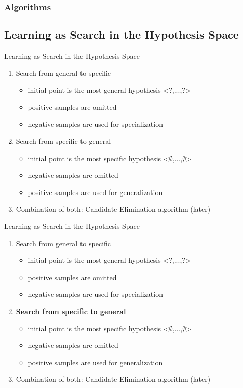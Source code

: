 \documentclass{beamer}
\begin{document}
\subsubsection{Algorithms}

\subsection{Learning as Search in the Hypothesis Space}
\begin{frame}{Learning as Search in the Hypothesis Space}
\begin{enumerate}
\item Search from general to specific
	\begin{itemize}
	\item initial point is the most general hypothesis <?,...,?>
    \item positive samples are omitted
    \item negative samples are used for specialization
	\end{itemize}
\item Search from specific to general
	\begin{itemize}
	\item initial point is the most specific hypothesis <$\emptyset$,...,$\emptyset$>
    \item negative samples are omitted
    \item positive samples are used for generalization
	\end{itemize}
\item Combination of both: Candidate Elimination algorithm (later)
\end{enumerate}
\end{frame}


\begin{frame}{Learning as Search in the Hypothesis Space}
\begin{enumerate}
\item Search from general to specific
	\begin{itemize}
	\item initial point is the most general hypothesis <?,...,?>
    \item positive samples are omitted
    \item negative samples are used for specialization
	\end{itemize}
\item \textbf{Search from specific to general}
	\begin{itemize}
	\item initial point is the most specific hypothesis <$\emptyset$,...,$\emptyset$>
    \item negative samples are omitted
    \item positive samples are used for generalization
	\end{itemize}
\item Combination of both: Candidate Elimination algorithm (later)
\end{enumerate}
\end{frame}
\end{document}
